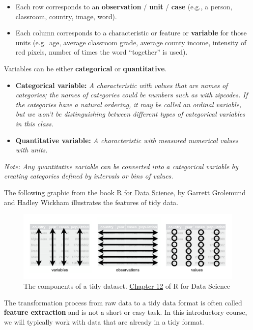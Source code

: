 \documentclass[]{book}
\providecommand{\tightlist}{%
  \setlength{\itemsep}{0pt}\setlength{\parskip}{0pt}}
\begin{document}
\begin{itemize}
\tightlist
\item
  Each row corresponds to an \textbf{observation} / \textbf{unit} / \textbf{case} (e.g., a person, classroom, country, image, word).
\item
  Each column corresponds to a characteristic or feature or \textbf{variable} for those units (e.g.~age, average classroom grade, average county income, intensity of red pixels, number of times the word ``together'' is used).
\end{itemize}

Variables can be either \textbf{categorical} or \textbf{quantitative}.

\begin{itemize}
\item
  \textbf{Categorical variable:} \emph{A characteristic with values that are names of categories; the names of categories could be numbers such as with zipcodes. If the categories have a natural ordering, it may be called an ordinal variable, but we won't be distinguishing between different types of categorical variables in this class.}
\item
  \textbf{Quantitative variable:} \emph{A characteristic with measured numerical values with units.}
\end{itemize}

\emph{Note: Any quantitative variable can be converted into a categorical variable by creating categories defined by intervals or bins of values.}

The following graphic from the book \href{http://r4ds.had.co.nz/}{R for Data Science}, by Garrett Grolemund and Hadley Wickham illustrates the features of tidy data.

\begin{figure}
\centering
\includegraphics{Photos/tidy.png}
\caption{The components of a tidy dataset. \href{http://r4ds.had.co.nz/tidy-data.html}{Chapter 12} of R for Data Science}
\end{figure}

The transformation process from raw data to a tidy data format is often called \textbf{feature extraction} and is not a short or easy task. In this introductory course, we will typically work with data that are already in a tidy format.
\end{document}

